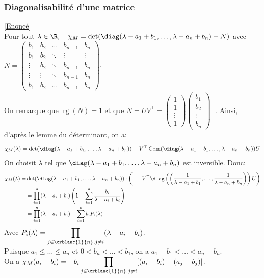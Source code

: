 \documentclass[8pt]{book}
\begin{document}
	\subsubsection{Diagonalisabilité d'une matrice }
	\label{Diagonalisabilité d'une matrice corrigé}
	\textcolor{blue}{\hyperref[Diagonalisabilité d'une matrice]{[Enoncé]}}\\
	Pour tout $\lambda\in\R,\quad \chi_M=\det(\diag(\lambda- a_1+b_1,\dots,\lambda-a_n+b_n)-N)$ avec $N=\begin{pmatrix}
		b_1  &b_2   &\dots &b_{n-1}&b_n\\
		b_1   &b_2  &\ddots&\vdots &\vdots\\
		\vdots&b_2   &\ddots&b_{n-1}&b_n\\
		\vdots&\vdots&\ddots&b_{n-1}&b_n\\
		b_1   &b_2   &\dots &b_{n-1}&b_n
	\end{pmatrix}$.
	\\On remarque que $\operatorname{rg}(N)=1$ et que $N=UV^\top=\begin{pmatrix}
		1\\1\\ \vdots \\1
	\end{pmatrix}\begin{pmatrix}
		b_1\\b_2\\\vdots\\b_n
	\end{pmatrix}^\top$. Ainsi, d'après le lemme du déterminant, on a: $$\chi_M(\lambda)=\det(\diag(\lambda-a_1+b_1,\dots,\lambda-a_n+b_n))-V^\top\operatorname{Com}(\diag(\lambda-a_1+b_1,\dots,\lambda-a_n+b_n))U$$
	On choisit $\lambda$ tel que $\diag(\lambda-a_1+b_1,\dots,\lambda-a_n+b_n)$ est inversible. Donc: \begin{align*}
		\chi_M(\lambda)=&\det(\diag(\lambda- a_1+b_1,\dots,\lambda-a_n+b_n))\cdot\left(1-V^\top\diag\left(\left(\frac{1}{\lambda- a_1+b_1},\dots,\frac{1}{\lambda-a_n+b_n}\right)\right)U\right)
		\\&=\prod_{i=1}^n(\lambda-a_i+b_i)\left(1-\sum_{i=1}^n\frac{b_i}{\lambda-a_i+b_i}\right)
		\\&=\prod_{i=1}^n(\lambda-a_i+b_i)-\sum_{i=1}^n b_iP_i(\lambda)
	\end{align*}
	Avec $P_i(\lambda)=\displaystyle\prod_{j\in\crblanc{1}{n}, j\ne i}(\lambda-a_i+b_i)$.
	\\Puisque $a_1\leq\dots\leq a_n$ et $0<b_n<\dots< b_1$, on a $a_1-b_1<\dots<a_n-b_n$.
	\\On a $\chi_M(a_i-b_i)=-b_i\displaystyle\prod_{j\in\crblanc{1}{n}, j\ne i}[(a_i-b_i)-(a_j-b_j)]$.
\end{document}
